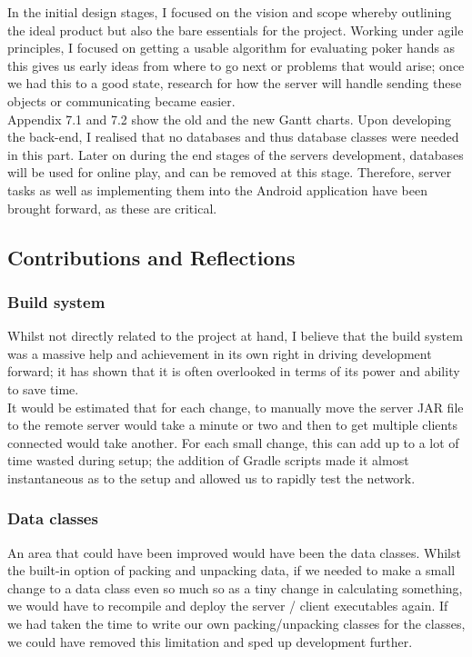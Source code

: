 \documentclass[11pt]{article}
\begin{document}
In the initial design stages, I focused on the vision and scope whereby outlining the ideal product but also the bare essentials for the project. Working under agile principles, I focused on getting a usable algorithm for evaluating poker hands as this gives us early ideas from where to go next or problems that would arise; once we had this to a good state, research for how the server will handle sending these objects or communicating became easier.  \\

Appendix 7.1 and 7.2 show the old and the new Gantt charts. Upon developing the back-end, I realised that no databases and thus database classes were needed in this part. Later on during the end stages of the servers development, databases will be used for online play, and can be removed at this stage. Therefore, server tasks as well as implementing them into the Android application have been brought forward, as these are critical.  \\

\subsection{Contributions and Reflections}

\subsubsection*{Build system}
Whilst not directly related to the project at hand, I believe that the build system was a massive help and achievement in its own right in driving development forward; it has shown that it is often overlooked in terms of its power and ability to save time. \\

It would be estimated that for each change, to manually move the server JAR file to the remote server would take a minute or two and then to get multiple clients connected would take another. For each small change, this can add up to a lot of time wasted during setup; the addition of Gradle scripts made it almost instantaneous as to the setup and allowed us to rapidly test the network.

\subsubsection{Data classes}
An area that could have been improved would have been the data classes. Whilst the built-in option of packing and unpacking data, if we needed to make a small change to a data class even so much so as a tiny change in calculating something, we would have to recompile and deploy the server / client executables again. If we had taken the time to write our own packing/unpacking classes for the classes, we could have removed this limitation and sped up development further. 
\end{document}
